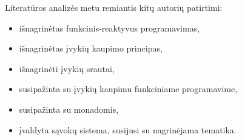 Literatūros analizės metu remiantis kitų autorių patirtimi:

\begin{itemize}

\item išnagrinėtas funkcinis-reaktyvus programavimas,

\item išnagrinėtas įvykių kaupimo principas,

\item išnagrinėti įvykių srautai,

\item susipažinta su įvykių kaupimu funkciniame programavime,

\item susipažinta su monadomis,

\item įvaldyta sąvokų sistema, susijusi su nagrinėjama tematika.

\end{itemize}
